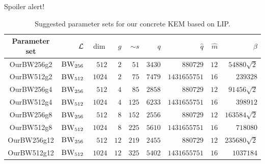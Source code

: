 \documentclass[10pt]{beamer}
\begin{document}
\begin{frame}{Spoiler alert!}

				\begin{table}[htbp]
								\centering
								\setlength{\tabcolsep}{3.2pt}
								\caption{Suggested parameter sets for our concrete KEM based on LIP.}\label{tab:parameters}
								\begin{tabular}{crrrrrrrr}
												\toprule
												Parameter set & $\mathcal{L}$ & $\dim$ & $g$ & $\sim s$ & $q$ & $\hat{q}$ & $\hat{m}$ & $\beta$ \\
												\midrule
												OurBW256g2 & $\textsc{BW}_{256}$ & $512$ & $2$ & $51$ & $3430$ & $880729$ & $12$ & $54880 \sqrt{2}$ \\
												OurBW512g2 & $\textsc{BW}_{512}$ & $1024$ & $2$ & $75$ & $7479$ & $1431655751$ & $16$ & $239328$ \\
												OurBW256g4 & $\textsc{BW}_{256}$ & $512$ & $4$ & $85$ & $2858$ & $880729$ & $12$ & $91456 \sqrt{2}$ \\
												OurBW512g4 & $\textsc{BW}_{512}$ & $1024$ & $4$ & $125$ & $6233$ & $1431655751$ & $16$ & $398912$ \\
												OurBW256g8 & $\textsc{BW}_{256}$ & $512$ & $8$ & $152$ & $2556$ & $880729$ & $12$ & $163584 \sqrt{2}$ \\
												OurBW512g8 & $\textsc{BW}_{512}$ & $1024$ & $8$ & $225$ & $5610$ & $1431655751$ & $16$ & $718080$ \\
												OurBW256g12 & $\textsc{BW}_{256}$ & $512$ & $12$ & $219$ & $2455$ & $880729$ & $12$ & $235680 \sqrt{2}$ \\
												OurBW512g12 & $\textsc{BW}_{512}$ & $1024$ & $12$ & $325$ & $5402$ & $1431655751$ & $16$ & $1037184$ \\
												\bottomrule
								\end{tabular}
				\end{table}

\end{frame}
\end{document}
